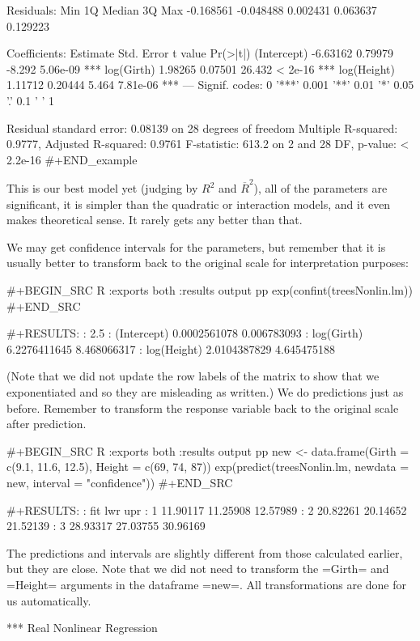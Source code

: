 Residuals:
      Min        1Q    Median        3Q       Max 
-0.168561 -0.048488  0.002431  0.063637  0.129223 

Coefficients:
            Estimate Std. Error t value Pr(>|t|)    
(Intercept) -6.63162    0.79979  -8.292 5.06e-09 ***
log(Girth)   1.98265    0.07501  26.432  < 2e-16 ***
log(Height)  1.11712    0.20444   5.464 7.81e-06 ***
---
Signif. codes:  0 '***' 0.001 '**' 0.01 '*' 0.05 '.' 0.1 ' ' 1

Residual standard error: 0.08139 on 28 degrees of freedom
Multiple R-squared:  0.9777,	Adjusted R-squared:  0.9761 
F-statistic: 613.2 on 2 and 28 DF,  p-value: < 2.2e-16
#+END_example

This is our best model yet (judging by \(R^{2}\) and
\(\overline{R}^{2}\)), all of the parameters are significant, it is
simpler than the quadratic or interaction models, and it even makes
theoretical sense. It rarely gets any better than that.

We may get confidence intervals for the parameters, but remember that
it is usually better to transform back to the original scale for
interpretation purposes:

#+BEGIN_SRC R :exports both :results output pp 
exp(confint(treesNonlin.lm))
#+END_SRC

#+RESULTS:
:                    2.5 %
: (Intercept) 0.0002561078 0.006783093
: log(Girth)  6.2276411645 8.468066317
: log(Height) 2.0104387829 4.645475188

(Note that we did not update the row labels of the matrix to show that
we exponentiated and so they are misleading as written.) We do
predictions just as before. Remember to transform the response
variable back to the original scale after prediction.

#+BEGIN_SRC R :exports both :results output pp 
new <- data.frame(Girth = c(9.1, 11.6, 12.5), Height = c(69, 74, 87))
exp(predict(treesNonlin.lm, newdata = new, interval = "confidence"))
#+END_SRC

#+RESULTS:
:        fit      lwr      upr
: 1 11.90117 11.25908 12.57989
: 2 20.82261 20.14652 21.52139
: 3 28.93317 27.03755 30.96169

The predictions and intervals are slightly different from those
calculated earlier, but they are close. Note that we did not need to
transform the =Girth= and =Height= arguments in the dataframe
=new=. All transformations are done for us automatically.

*** Real Nonlinear Regression

